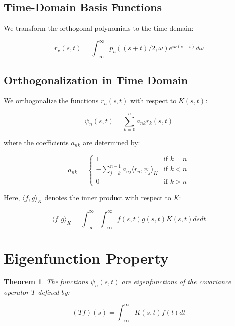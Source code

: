 \documentclass{article}
\newtheorem{theorem}{Theorem}
\begin{document}
\subsection{Time-Domain Basis Functions}

We transform the orthogonal polynomials to the time domain:

\begin{equation}
r_n(s,t) = \int_{-\infty}^{\infty} p_n((s+t)/2, \omega) e^{i\omega(s-t)} d\omega
\end{equation}

\subsection{Orthogonalization in Time Domain}

We orthogonalize the functions $r_n(s,t)$ with respect to $K(s,t)$:

\begin{equation}
\psi_n(s,t) = \sum_{k=0}^n a_{nk} r_k(s,t)
\end{equation}

where the coefficients $a_{nk}$ are determined by:

\begin{equation}
a_{nk} = \begin{cases}
1 & \text{if } k = n \\
-\sum_{j=k}^{n-1} a_{nj} \langle r_n, \psi_j \rangle_K & \text{if } k < n \\
0 & \text{if } k > n
\end{cases}
\end{equation}

Here, $\langle f, g \rangle_K$ denotes the inner product with respect to $K$:

\begin{equation}
\langle f, g \rangle_K = \int_{-\infty}^{\infty}\int_{-\infty}^{\infty} f(s,t) g(s,t) K(s,t) ds dt
\end{equation}

\section{Eigenfunction Property}

\begin{theorem}
The functions $\psi_n(s,t)$ are eigenfunctions of the covariance operator $T$ defined by:

\begin{equation}
(Tf)(s) = \int_{-\infty}^{\infty} K(s,t) f(t) dt
\end{equation}
\end{theorem}
\end{document}
